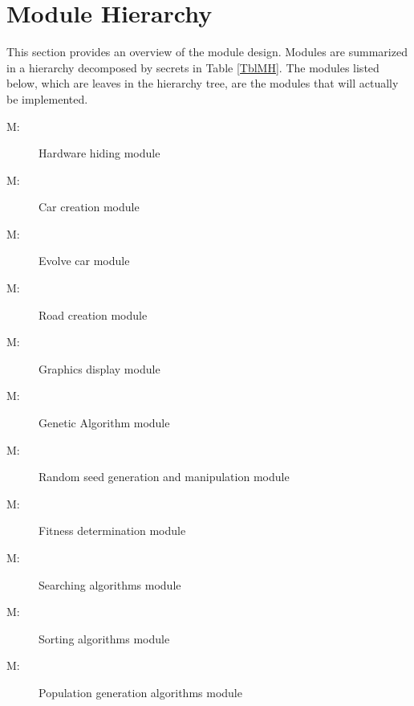 \documentclass[12pt, titlepage]{article}
\newcounter{mnum}
\newcommand{\mthemnum}{M\themnum}
\begin{document}
\section{Module Hierarchy} \label{SecMH}

This section provides an overview of the module design. Modules are summarized
in a hierarchy decomposed by secrets in Table \ref{TblMH}. The modules listed
below, which are leaves in the hierarchy tree, are the modules that will
actually be implemented.

\begin{description}
\item [ \mthemnum \label{mHardware}:] Hardware hiding 
module
\item [ \mthemnum \label{mCreateCar}:]  Car creation module
\item [ \mthemnum \label{mEvolveCar}:] Evolve car module
\item [ \mthemnum \label{mCreateRoad}:] Road creation 
module
\item [ \mthemnum \label{mGraphicsDisplay}:] Graphics 
display module
\item [ \mthemnum \label{mGeneticAlgorithm}:] Genetic 
Algorithm module
\item [ \mthemnum \label{mRandomSeed}:] Random seed 
generation and manipulation module
\item [ \mthemnum \label{mFitness}:] Fitness determination 
module
\item [ \mthemnum \label{mSearching}:] Searching algorithms 
module
\item [ \mthemnum \label{mSorting}:] Sorting algorithms 
module
\item [ \mthemnum \label{mPopulationGeneration}:] 
Population generation algorithms module
\end{description}
\end{document}
